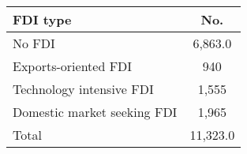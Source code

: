 \documentclass[]{article}
\begin{document}
\begin{tabular}{lc} \hline
 FDI type&No. \\
\hline
No FDI&6,863.0 \\
Exports-oriented FDI&940 \\
Technology intensive FDI&1,555 \\
 Domestic market seeking FDI&1,965 \\
Total&11,323.0 \\
\end{tabular}
\end{document}
